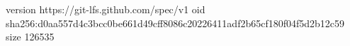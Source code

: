 version https://git-lfs.github.com/spec/v1
oid sha256:d0aa557d4c3bcc0be661d49cff8086c20226411adf2b65cf180f04f5d2b12c59
size 126535
